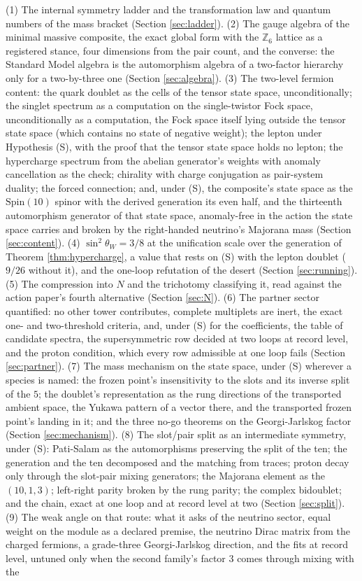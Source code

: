 \documentclass[11pt]{article}
\theoremstyle{definition}
\begin{document}
(1) The internal symmetry ladder and the transformation law and quantum numbers of the mass bracket (Section \ref{sec:ladder}). (2) The gauge algebra of the minimal massive composite, the exact global form with the $\mathbb{Z}_{6}$ lattice as a registered stance, four dimensions from the pair count, and the converse: the Standard Model algebra is the automorphism algebra of a two-factor hierarchy only for a two-by-three one (Section \ref{sec:algebra}). (3) The two-level fermion content: the quark doublet as the cells of the tensor state space, unconditionally; the singlet spectrum as a computation on the single-twistor Fock space, unconditionally as a computation, the Fock space itself lying outside the tensor state space (which contains no state of negative weight); the lepton under Hypothesis (S), with the proof that the tensor state space holds no lepton; the hypercharge spectrum from the abelian generator's weights with anomaly cancellation as the check; chirality with charge conjugation as pair-system duality; the forced connection; and, under (S), the composite's state space as the $\mathrm{Spin}(10)$ spinor with the derived generation its even half, and the thirteenth automorphism generator of that state space, anomaly-free in the action the state space carries and broken by the right-handed neutrino's Majorana mass (Section \ref{sec:content}). (4) $\sin^{2}\theta_{W} = 3/8$ at the unification scale over the generation of Theorem \ref{thm:hypercharge}, a value that rests on (S) with the lepton doublet ($9/26$ without it), and the one-loop refutation of the desert (Section \ref{sec:running}). (5) The compression into $N$ and the trichotomy classifying it, read against the action paper's fourth alternative (Section \ref{sec:N}). (6) The partner sector quantified: no other tower contributes, complete multiplets are inert, the exact one- and two-threshold criteria, and, under (S) for the coefficients, the table of candidate spectra, the supersymmetric row decided at two loops at record level, and the proton condition, which every row admissible at one loop fails (Section \ref{sec:partner}). (7) The mass mechanism on the state space, under (S) wherever a species is named: the frozen point's insensitivity to the slots and its inverse split of the $5$; the doublet's representation as the rung directions of the transported ambient space, the Yukawa pattern of a vector there, and the transported frozen point's landing in it; and the three no-go theorems on the Georgi-Jarlskog factor (Section \ref{sec:mechanism}). (8) The slot/pair split as an intermediate symmetry, under (S): Pati-Salam as the automorphisms preserving the split of the ten; the generation and the ten decomposed and the matching from traces; proton decay only through the slot-pair mixing generators; the Majorana element as the $(10,1,3)$; left-right parity broken by the rung parity; the complex bidoublet; and the chain, exact at one loop and at record level at two (Section \ref{sec:split}). (9) The weak angle on that route: what it asks of the neutrino sector, equal weight on the module as a declared premise, the neutrino Dirac matrix from the charged fermions, a grade-three Georgi-Jarlskog direction, and the fits at record level, untuned only when the second family's factor $3$ comes through mixing with the 
\end{document}
